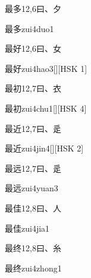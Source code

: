 \begin{entry}{最多}{12,6}{⽈、⼣}
  \begin{phonetics}{最多}{zui4duo1}
  \end{phonetics}
\end{entry}

\begin{entry}{最好}{12,6}{⽈、⼥}
  \begin{phonetics}{最好}{zui4hao3}[][HSK 1]
  \end{phonetics}
\end{entry}

\begin{entry}{最初}{12,7}{⽈、⾐}
  \begin{phonetics}{最初}{zui4chu1}[][HSK 4]
  \end{phonetics}
\end{entry}

\begin{entry}{最近}{12,7}{⽈、⾡}
  \begin{phonetics}{最近}{zui4jin4}[][HSK 2]
  \end{phonetics}
\end{entry}

\begin{entry}{最远}{12,7}{⽈、⾡}
  \begin{phonetics}{最远}{zui4yuan3}
  \end{phonetics}
\end{entry}

\begin{entry}{最佳}{12,8}{⽈、⼈}
  \begin{phonetics}{最佳}{zui4jia1}
  \end{phonetics}
\end{entry}

\begin{entry}{最终}{12,8}{⽈、⽷}
  \begin{phonetics}{最终}{zui4zhong1}
  \end{phonetics}
\end{entry}

